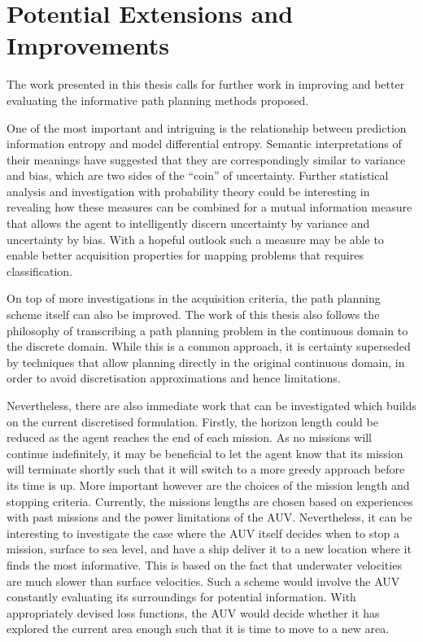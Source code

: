 	\section{Potential Extensions and Improvements}
	
		The work presented in this thesis calls for further work in improving and better evaluating the informative path planning methods proposed.
		
		One of the most important and intriguing is the relationship between prediction information entropy and model differential entropy. Semantic interpretations of their meanings have suggested that they are correspondingly similar to variance and bias, which are two sides of the ``coin'' of uncertainty. Further statistical analysis and investigation with probability theory could be interesting in revealing how these measures can be combined for a mutual information measure that allows the agent to intelligently discern uncertainty by variance and uncertainty by bias. With a hopeful outlook such a measure may be able to enable better acquisition properties for mapping problems that requires classification.
		
		On top of more investigations in the acquisition criteria, the path planning scheme itself can also be improved. The work of this thesis also follows the philosophy of transcribing a path planning problem in the continuous domain to the discrete domain. While this is a common approach, it is certainty superseded by techniques that allow planning directly in the original continuous domain, in order to avoid discretisation approximations and hence limitations. 
		
		Nevertheless, there are also immediate work that can be investigated which builds on the current discretised formulation. Firstly, the horizon length could be reduced as the agent reaches the end of each mission. As no missions will continue indefinitely, it may be beneficial to let the agent know that its mission will terminate shortly such that it will switch to a more greedy approach before its time is up. More important however are the choices of the mission length and stopping criteria. Currently, the missions lengths are chosen based on experiences with past missions and the power limitations of the AUV. Nevertheless, it can be interesting to investigate the case where the AUV itself decides when to stop a mission, surface to sea level, and have a ship deliver it to a new location where it finds the most informative. This is based on the fact that underwater velocities are much slower than surface velocities. Such a scheme would involve the AUV constantly evaluating its surroundings for potential information. With appropriately devised loss functions, the AUV would decide whether it has explored the current area enough such that it is time to move to a new area.
			
